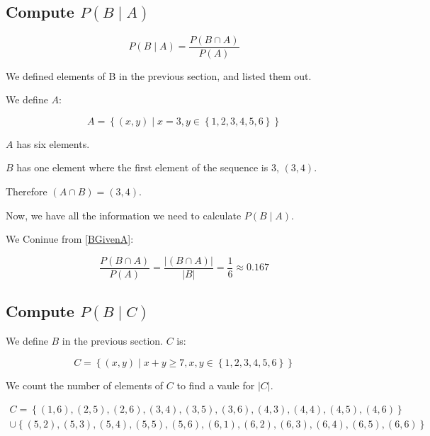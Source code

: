 \documentclass[a4paper,11pt]{article}
\begin{document}
\subsection{Compute $P \left( B \mid A \right)$}

\begin{equation}  
  P \left( B \mid A \right) =
  \frac {P \left( B \cap A \right) } { P \left( A \right) }
\end{equation}

We defined elements of B in the previous section, and listed them out.

We define $A$:

\begin{equation} \label{BGivenA}
  A = \left\{ \left(x, y \right) \mid x = 3, y \in 
    \left\{ 1, 2, 3, 4, 5, 6 \right\} \right\}
\end{equation}

$A$ has six elements.

$B$ has one element where the first element of the sequence is $3$,
$\left(3, 4 \right)$.

Therefore $\left( A \cap B \right) = \left( 3,4 \right)$.{}

Now, we have all the information we need to calculate 
$P \left( B \mid A \right)$.{}

We Coninue from \ref{BGivenA}:

\begin{equation}  
  \frac {P \left( B \cap A \right) } { P \left( A \right) } =
  \frac {\left| \left( B \cap A \right) \right|}
    {\left| B \right|} = \frac{1}{6} \approx 0.167
\end{equation}

\subsection{Compute $P\left( B \mid C \right)$}

We define $B$ in the previous section.  $C$ is:

\begin{equation}
  C = \left\{ \left( x, y \right) \mid x + y \geq 7, x,y \in{}
    \left\{ 1, 2, 3, 4, 5, 6 \right\} \right\}
\end{equation}

We count the number of elements of $C$ to find a vaule for 
$\left| C \right|$.

\begin{multline}
  C = \left\{ \left( 1, 6 \right),
    \left( 2, 5 \right),
    \left( 2, 6 \right),
    \left( 3, 4 \right),
    \left( 3, 5 \right),
    \left( 3, 6 \right),
    \left( 4, 3 \right),
    \left( 4, 4 \right),
    \left( 4, 5 \right),
    \left( 4, 6 \right)\right\} \\ \cup \left\{ \left( 5, 2 \right),
    \left( 5, 3 \right),
    \left( 5, 4 \right),
    \left( 5, 5 \right),
    \left( 5, 6 \right),
    \left( 6, 1 \right),
    \left( 6, 2 \right),
    \left( 6, 3 \right),
    \left( 6, 4 \right),
    \left( 6, 5 \right),
    \left( 6, 6 \right) \right\}
\end{multline}
\end{document}
